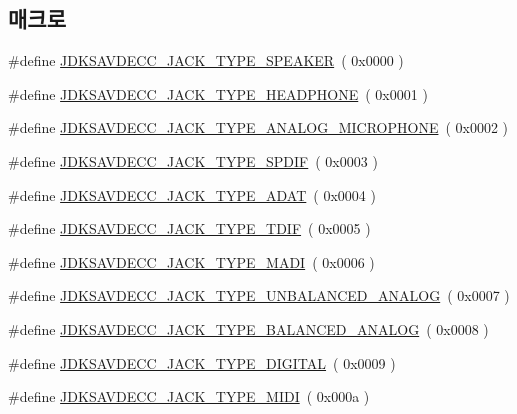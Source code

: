\subsection*{매크로}
\begin{DoxyCompactItemize}
\item 
\#define \hyperlink{group__jack__type_ga162737387e17eda8231a6e2f2acd9efe}{J\+D\+K\+S\+A\+V\+D\+E\+C\+C\+\_\+\+J\+A\+C\+K\+\_\+\+T\+Y\+P\+E\+\_\+\+S\+P\+E\+A\+K\+ER}~( 0x0000 )
\item 
\#define \hyperlink{group__jack__type_gafc221688315179894bc193b7698ce28b}{J\+D\+K\+S\+A\+V\+D\+E\+C\+C\+\_\+\+J\+A\+C\+K\+\_\+\+T\+Y\+P\+E\+\_\+\+H\+E\+A\+D\+P\+H\+O\+NE}~( 0x0001 )
\item 
\#define \hyperlink{group__jack__type_ga5eb0827c405d4ca933a8372066e0bb67}{J\+D\+K\+S\+A\+V\+D\+E\+C\+C\+\_\+\+J\+A\+C\+K\+\_\+\+T\+Y\+P\+E\+\_\+\+A\+N\+A\+L\+O\+G\+\_\+\+M\+I\+C\+R\+O\+P\+H\+O\+NE}~( 0x0002 )
\item 
\#define \hyperlink{group__jack__type_ga405f9dab303d83c3d62d13f5851430b8}{J\+D\+K\+S\+A\+V\+D\+E\+C\+C\+\_\+\+J\+A\+C\+K\+\_\+\+T\+Y\+P\+E\+\_\+\+S\+P\+D\+IF}~( 0x0003 )
\item 
\#define \hyperlink{group__jack__type_gabd4cd7c71c1961b689fc32cb795be51c}{J\+D\+K\+S\+A\+V\+D\+E\+C\+C\+\_\+\+J\+A\+C\+K\+\_\+\+T\+Y\+P\+E\+\_\+\+A\+D\+AT}~( 0x0004 )
\item 
\#define \hyperlink{group__jack__type_gae19d9a826b6e8fdb6e2382d8363e4f73}{J\+D\+K\+S\+A\+V\+D\+E\+C\+C\+\_\+\+J\+A\+C\+K\+\_\+\+T\+Y\+P\+E\+\_\+\+T\+D\+IF}~( 0x0005 )
\item 
\#define \hyperlink{group__jack__type_ga3764fef1db3529c8cf7f707f182af9b4}{J\+D\+K\+S\+A\+V\+D\+E\+C\+C\+\_\+\+J\+A\+C\+K\+\_\+\+T\+Y\+P\+E\+\_\+\+M\+A\+DI}~( 0x0006 )
\item 
\#define \hyperlink{group__jack__type_ga13f0eebed5f12a6a5d164e47d569cdb5}{J\+D\+K\+S\+A\+V\+D\+E\+C\+C\+\_\+\+J\+A\+C\+K\+\_\+\+T\+Y\+P\+E\+\_\+\+U\+N\+B\+A\+L\+A\+N\+C\+E\+D\+\_\+\+A\+N\+A\+L\+OG}~( 0x0007 )
\item 
\#define \hyperlink{group__jack__type_gad28ec33702518d6bd1f953d85a5f2cfc}{J\+D\+K\+S\+A\+V\+D\+E\+C\+C\+\_\+\+J\+A\+C\+K\+\_\+\+T\+Y\+P\+E\+\_\+\+B\+A\+L\+A\+N\+C\+E\+D\+\_\+\+A\+N\+A\+L\+OG}~( 0x0008 )
\item 
\#define \hyperlink{group__jack__type_ga0b816098bf17cc03839441ddeb3ca23e}{J\+D\+K\+S\+A\+V\+D\+E\+C\+C\+\_\+\+J\+A\+C\+K\+\_\+\+T\+Y\+P\+E\+\_\+\+D\+I\+G\+I\+T\+AL}~( 0x0009 )
\item 
\#define \hyperlink{group__jack__type_ga8639374aaf8a7f137724ca68c8b34112}{J\+D\+K\+S\+A\+V\+D\+E\+C\+C\+\_\+\+J\+A\+C\+K\+\_\+\+T\+Y\+P\+E\+\_\+\+M\+I\+DI}~( 0x000a )

\end{DoxyCompactItemize}
